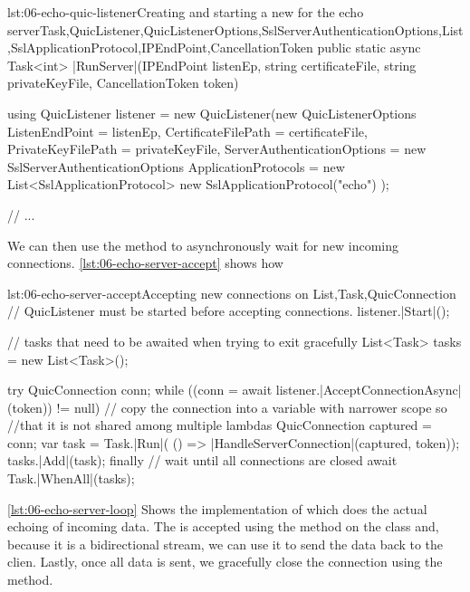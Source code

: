 \begin{myListingCsharp}{lst:06-echo-quic-listener}{Creating and starting a new \QuicListener{} for the echo server}{Task,QuicListener,QuicListenerOptions,SslServerAuthenticationOptions,List,SslApplicationProtocol,IPEndPoint,CancellationToken}{}
public static async Task<int> |RunServer|(IPEndPoint listenEp,
    string certificateFile, string privateKeyFile, CancellationToken token)
{
    using QuicListener listener = new QuicListener(new QuicListenerOptions
    {
        ListenEndPoint = listenEp,
        CertificateFilePath = certificateFile,
        PrivateKeyFilePath = privateKeyFile,
        ServerAuthenticationOptions = new SslServerAuthenticationOptions
        {
            ApplicationProtocols = new List<SslApplicationProtocol>
            {
                new SslApplicationProtocol("echo")
            }
        }
    });

    // ...
}
\end{myListingCsharp}

We can then use the  method to asynchronously wait for new incoming connections. \autoref{lst:06-echo-server-accept} shows how

\begin{myListingCsharp}{lst:06-echo-server-accept}{Accepting new connections on \QuicListener{}}{List,Task,QuicConnection}{}
    // QuicListener must be started before accepting connections.
    listener.|Start|();

    // tasks that need to be awaited when trying to exit gracefully
    List<Task> tasks = new List<Task>();

    try
    {
        QuicConnection conn;
        while ((conn = await listener.|AcceptConnectionAsync|(token)) != null)
        {
            // copy the connection into a variable with narrower scope so
            //that it is not shared among multiple lambdas
            QuicConnection captured = conn;
            var task = Task.|Run|(
                () => |HandleServerConnection|(captured, token));
            tasks.|Add|(task);
        }
    }
    finally
    {
        // wait until all connections are closed
        await Task.|WhenAll|(tasks);
    }
\end{myListingCsharp}

\autoref{lst:06-echo-server-loop} Shows the implementation of  which
does the actual echoing of incoming data. The \QuicStream{} is accepted using the
 method on the \QuicConnection{} class and, because it is a bidirectional
stream, we can use it to send the data back to the clien. Lastly, once all data is sent, we
gracefully close the connection using the  method.

